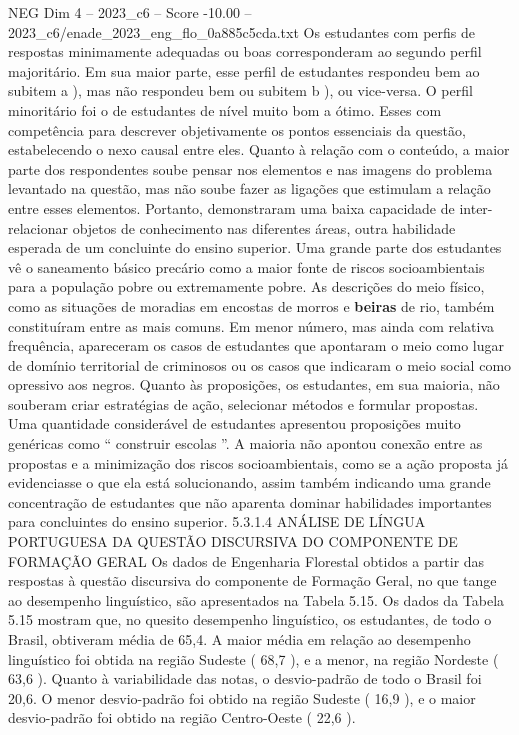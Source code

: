 \begin{textsample}{NEG Dim 4 – 2023\_c6 – Score -10.00 – 2023\_c6/enade\_2023\_eng\_flo\_0a885c5cda.txt}
Os estudantes com perfis de respostas minimamente adequadas ou boas corresponderam ao segundo perfil majoritário.
Em sua maior parte, esse perfil de estudantes respondeu bem ao subitem a ), mas não respondeu bem ou subitem b ), ou vice-versa.
O perfil minoritário foi o de estudantes de nível muito bom a ótimo.
Esses com competência para descrever objetivamente os pontos essenciais da questão, estabelecendo o nexo causal entre eles.
Quanto à relação com o conteúdo, a maior parte dos respondentes soube pensar nos elementos e nas imagens do problema levantado na questão, mas não soube fazer as ligações que estimulam a relação entre esses elementos.
Portanto, demonstraram uma baixa capacidade de inter-relacionar objetos de conhecimento nas diferentes áreas, outra habilidade esperada de um concluinte do ensino superior.
Uma grande parte dos estudantes vê o saneamento básico precário como a maior fonte de riscos socioambientais para a população pobre ou extremamente pobre.
As descrições do meio físico, como as situações de moradias em encostas de morros e \textbf{beiras} de rio, também constituíram entre as mais comuns.
Em menor número, mas ainda com relativa frequência, apareceram os casos de estudantes que apontaram o meio como lugar de domínio territorial de criminosos ou os casos que indicaram o meio social como opressivo aos negros.
Quanto às proposições, os estudantes, em sua maioria, não souberam criar estratégias de ação, selecionar métodos e formular propostas.
Uma quantidade considerável de estudantes apresentou proposições muito genéricas como “ construir escolas ”.
A maioria não apontou conexão entre as propostas e a minimização dos riscos socioambientais, como se a ação proposta já evidenciasse o que ela está solucionando, assim também indicando uma grande concentração de estudantes que não aparenta dominar habilidades importantes para concluintes do ensino superior. 5.3.1.4 ANÁLISE DE LÍNGUA PORTUGUESA DA QUESTÃO DISCURSIVA DO COMPONENTE DE FORMAÇÃO GERAL Os dados de Engenharia Florestal obtidos a partir das respostas à questão discursiva do componente de Formação Geral, no que tange ao desempenho linguístico, são apresentados na Tabela 5.15.
Os dados da Tabela 5.15 mostram que, no quesito desempenho linguístico, os estudantes, de todo o Brasil, obtiveram média de 65,4.
A maior média em relação ao desempenho linguístico foi obtida na região Sudeste ( 68,7 ), e a menor, na região Nordeste ( 63,6 ).
Quanto à variabilidade das notas, o desvio-padrão de todo o Brasil foi 20,6.
O menor desvio-padrão foi obtido na região Sudeste ( 16,9 ), e o maior desvio-padrão foi obtido na região Centro-Oeste ( 22,6 ).

\end{textsample}
